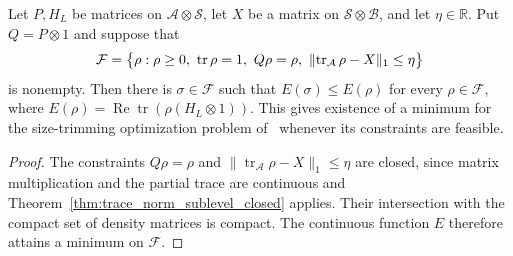 \begin{theorem}
    \label{thm:boundary_density_minimizer_nonempty}
    \leanok
    Let $P,H_L$ be matrices on $\mathcal A\otimes\mathcal S$, let $X$ be a
    matrix on $\mathcal S\otimes\mathcal B$, and let $\eta\in\mathbb R$.
    Put $Q=P\otimes1$ and suppose that
    \begin{align}
        \mathcal F=\bigl\{\rho:\rho\ge0,\ \operatorname{tr}\rho=1,\
        Q\rho=\rho,\
        \lVert\operatorname{tr}_{\mathcal A}\rho-X\rVert_1\le\eta\bigr\}
        \notag
    \end{align}
    is nonempty. Then there is $\sigma\in\mathcal F$ such that
    $E(\sigma)\le E(\rho)$ for every $\rho\in\mathcal F$, where
    $E(\rho)=\operatorname{Re}\operatorname{tr}(\rho(H_L\otimes1))$.
    This gives existence of a minimum for the size-trimming optimization
    problem of~\cite[lines 472--476]{Landau2013PolynomialTime} whenever its
    constraints are feasible.
\end{theorem}
\begin{proof}\leanok
    The constraints $Q\rho=\rho$ and
    $\lVert\operatorname{tr}_{\mathcal A}\rho-X\rVert_1\le\eta$ are closed,
    since matrix multiplication and the partial trace are continuous and
    Theorem~\ref{thm:trace_norm_sublevel_closed} applies. Their intersection
    with the compact set of density matrices is compact.
    The continuous function $E$ therefore attains a minimum on
    $\mathcal F$.
\end{proof}

